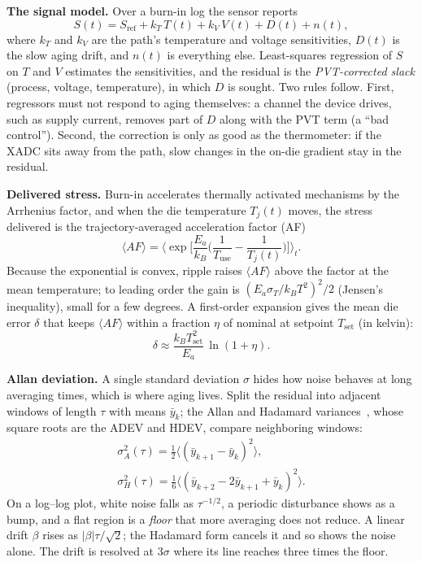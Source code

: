 \documentclass[10pt,twocolumn]{article}
\begin{document}
\textbf{The signal model.} Over a burn-in log the sensor reports
\begin{equation}
S(t)=S_{\mathrm{ref}}+k_T\,T(t)+k_V\,V(t)+D(t)+n(t),
\label{eq:model}
\end{equation}
where $k_T$ and $k_V$ are the path's temperature and voltage sensitivities, $D(t)$ is the slow aging drift, and $n(t)$ is everything else. Least-squares regression of $S$ on $T$ and $V$ estimates the sensitivities, and the residual is the \emph{PVT-corrected slack} (process, voltage, temperature), in which $D$ is sought. Two rules follow. First, regressors must not respond to aging themselves: a channel the device drives, such as supply current, removes part of $D$ along with the PVT term (a ``bad control''). Second, the correction is only as good as the thermometer: if the XADC sits away from the path, slow changes in the on-die gradient stay in the residual.

\textbf{Delivered stress.} Burn-in accelerates thermally activated mechanisms by the Arrhenius factor, and when the die temperature $T_j(t)$ moves, the stress delivered is the trajectory-averaged acceleration factor (AF)
\begin{equation}
\langle AF\rangle=\Big\langle \exp\!\Big[\frac{E_a}{k_B}\Big(\frac{1}{T_{\mathrm{use}}}-\frac{1}{T_j(t)}\Big)\Big]\Big\rangle_t .
\label{eq:af}
\end{equation}
Because the exponential is convex, ripple raises $\langle AF\rangle$ above the factor at the mean temperature; to leading order the gain is $(E_a\sigma_T/k_BT^2)^2/2$ (Jensen's inequality), small for a few degrees. A first-order expansion gives the mean die error $\delta$ that keeps $\langle AF\rangle$ within a fraction $\eta$ of nominal at setpoint $T_{\mathrm{set}}$ (in kelvin):
\begin{equation}
\delta\approx\frac{k_B T_{\mathrm{set}}^2}{E_a}\,\ln(1+\eta).
\label{eq:delta}
\end{equation}

\textbf{Allan deviation.} A single standard deviation $\sigma$ hides how noise behaves at long averaging times, which is where aging lives. Split the residual into adjacent windows of length $\tau$ with means $\bar y_k$; the Allan and Hadamard variances~\cite{allan}, whose square roots are the ADEV and HDEV, compare neighboring windows:
\begin{gather}
\sigma_A^2(\tau)=\frac{1}{2}\big\langle(\bar y_{k+1}-\bar y_k)^2\big\rangle,\nonumber\\
\sigma_H^2(\tau)=\frac{1}{6}\big\langle(\bar y_{k+2}-2\bar y_{k+1}+\bar y_k)^2\big\rangle.
\label{eq:allan}
\end{gather}
On a log--log plot, white noise falls as $\tau^{-1/2}$, a periodic disturbance shows as a bump, and a flat region is a \emph{floor} that more averaging does not reduce. A linear drift $\beta$ rises as $|\beta|\tau/\sqrt2$; the Hadamard form cancels it and so shows the noise alone. The drift is resolved at 3$\sigma$ where its line reaches three times the floor.
\end{document}
